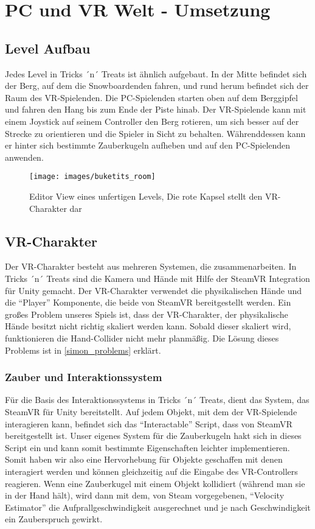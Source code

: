 \chapter{PC und VR Welt - Umsetzung}
\section{Level Aufbau}
Jedes Level in Tricks ´n´ Treats ist ähnlich aufgebaut. 
In der Mitte befindet sich der Berg, auf dem die Snowboardenden fahren, und rund herum befindet sich der Raum des VR-Spielenden. Die PC-Spielenden starten oben auf dem Berggipfel und fahren den Hang bis zum Ende der Piste hinab. Der VR-Spielende kann mit einem Joystick auf seinem Controller den Berg rotieren, um sich besser auf der Strecke zu orientieren und die Spieler in Sicht zu behalten. Währenddessen kann er hinter sich bestimmte Zauberkugeln aufheben und auf den PC-Spielenden anwenden.


\begin{figure}[H]
	\centering
	\texttt{[image: images/buketits\_room]}
	\caption{Editor View eines unfertigen Levels, Die rote Kapsel stellt den VR-Charakter dar}
\end{figure}

\section{VR-Charakter} \label{simon_vrspieler}
Der VR-Charakter besteht aus mehreren Systemen, die zusammenarbeiten. In Tricks ´n´ Treats sind die Kamera und Hände mit Hilfe der SteamVR Integration für Unity gemacht. Der VR-Charakter verwendet die physikalischen Hände und die "`Player"' Komponente, die beide von SteamVR bereitgestellt werden. Ein großes Problem unseres Spiels ist, dass der VR-Charakter, der physikalische Hände besitzt nicht richtig skaliert werden kann. Sobald dieser skaliert wird, funktionieren die Hand-Collider nicht mehr planmäßig. Die Lösung dieses Problems ist in \ref{simon_problems} erklärt.

\subsection{Zauber und Interaktionssystem}
Für die Basis des Interaktionssystems in Tricks ´n´ Treats, dient das System, das SteamVR für Unity bereitstellt. Auf jedem Objekt, mit dem der VR-Spielende interagieren kann, befindet sich das "`Interactable"' Script, dass von SteamVR bereitgestellt ist. Unser eigenes System für die Zauberkugeln hakt sich in dieses Script ein und kann somit bestimmte Eigenschaften leichter implementieren. Somit haben wir also eine Hervorhebung für Objekte geschaffen mit denen interagiert werden und können gleichzeitig auf die Eingabe des VR-Controllers reagieren. Wenn eine Zauberkugel mit einem Objekt kollidiert (während man sie in der Hand hält), wird dann mit dem, von Steam vorgegebenen, "`Velocity Estimator"' die Aufprallgeschwindigkeit ausgerechnet und je nach Geschwindigkeit ein Zauberspruch gewirkt.

